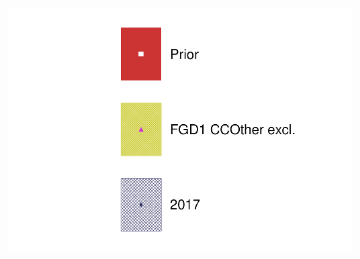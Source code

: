 \begin{figure}[h]
	\begin{subfigure}[t]{0.10\textwidth}
		\includegraphics[width=\textwidth, trim={0mm 0mm 0mm 0mm}, clip,page=1]{figures/mach3/data/alt/2017b_NoFGD1CCOth_Data_merg_2017b_NewData_NewDet_UpdXsecStep_2Xsec_4Det_5Flux_0}
	\end{subfigure}
	

\end{figure}
